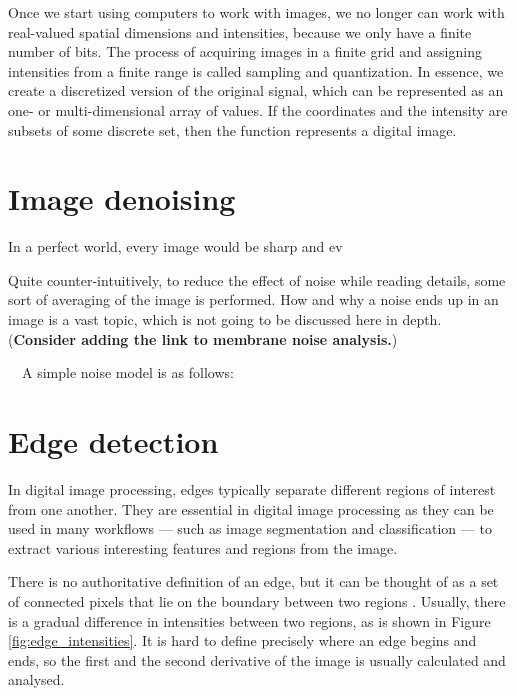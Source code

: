 \documentclass[
  digital,     %
  oneside,     %
  nosansbold,  %
  nocolorbold, %
  lof,         %
  lot,         %
]{fithesis4}
\begin{document}
Once we start using computers to work with images, we no longer can work with
real-valued spatial dimensions and intensities, because we only have a finite
number of bits. The process of acquiring images in a finite grid and assigning
intensities from a finite range is called sampling and quantization. In essence,
we create a discretized version of the original signal, which can be represented
as an one- or multi-dimensional array of values. If the coordinates and the
intensity are subsets of some discrete set, then the function represents a
digital image.

\section{Image denoising}

In a perfect world, every image would be sharp and ev

Quite counter-intuitively, to reduce the effect of noise while reading details,
some sort of averaging of the image is performed. How and why a noise ends up in
an image is a vast topic, which is not going to be discussed here in depth.
(\textbf{Consider adding the link to membrane noise analysis.}) 

~~A simple noise
model is as follows:~


\section{Edge detection}

In digital image processing, edges typically separate different regions of
interest from one another. They are essential in digital image processing
as they can be used in many workflows --- such as image segmentation and
classification --- to extract various interesting features and regions
from the image.

There is no authoritative definition of an edge, but it can be thought of as a
set of connected pixels that lie on the boundary between two regions
\cite{gonzalez2002}. Usually, there is a gradual difference in intensities
between two regions, as is shown in Figure \ref{fig:edge_intensities}. It is
hard to define precisely where an edge begins and ends, so the first and the
second derivative of the image is usually calculated and analysed.
\end{document}
